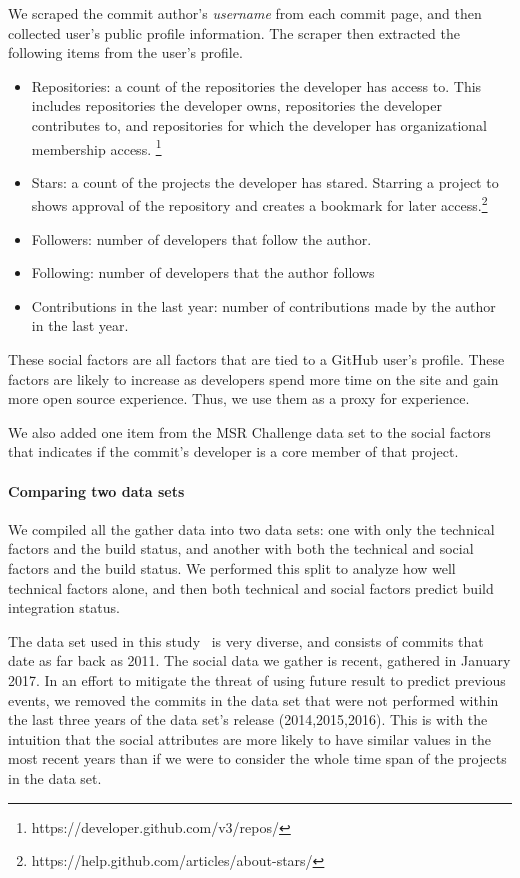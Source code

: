 \documentclass[10pt, conference]{IEEEtran}
\begin{document}
We scraped the commit author's
\textit{username} from each commit page, and then
collected user's public profile information. 
%
The scraper then extracted the following items from the user's
profile.

\begin{itemize}
\item Repositories: a count of the repositories the developer has access to. This 
includes repositories the developer owns, repositories the developer contributes
to, and repositories for which the developer has organizational membership access.
\footnote{https://developer.github.com/v3/repos/}
\item Stars: a count of the projects the developer has stared. Starring a project
to shows approval of the repository and creates  a bookmark for later 
access.\footnote{https://help.github.com/articles/about-stars/}
\item Followers: number of developers that follow the author. 
\item Following: number of developers that the author follows 
\item Contributions in the last year: number of contributions made by the author in the last year.
\end{itemize}

These social factors are all factors that are tied to a GitHub user's profile.
These factors are likely to increase as developers spend more time on the site
and gain more open source experience.  Thus, we use them as a proxy for
experience.


We also added one item from the MSR Challenge data set to the social factors that indicates if the commit's developer is a core member 
of that project.

\paragraph{Comparing two data sets} We compiled all the gather data into 
two data sets: one with only the technical
factors and the build status, and another with both the technical and social
factors and the build status. We performed this split to analyze how well technical factors alone,
and then both technical and social
factors predict build integration status.

The data set used in this study~\cite{msr17challenge} is very diverse,
and consists of commits that date as far back as 2011. The social data we 
gather is recent, gathered in January 2017. In an effort to mitigate the threat of
using future result to predict previous events,
we removed the commits in the data set that were not performed within the last
three years of the data set's release (2014,2015,2016).  This is with the intuition that the social attributes are more likely to have similar values in the most recent years than if we were to consider the whole time span of the projects in the data set.
\end{document}
